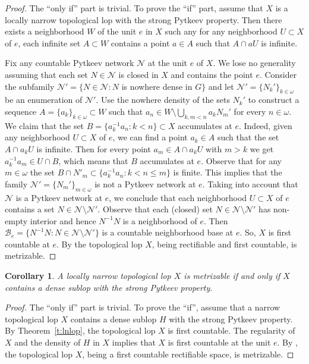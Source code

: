\documentclass{amsart}
\newtheorem{corollary}[theorem]{Corollary}
\theoremstyle{definition}
\begin{document}
\begin{proof} The ``only if'' part is trivial. To prove the ``if'' part, assume that $X$ is a locally narrow topological lop with the strong Pytkeev property. Then there exists a neighborhood $W$ of the unit $e$ in $X$ such any for any neighborhood $U\subset X$ of $e$, each infinite set $A\subset W$ contains a point $a\in A$ such that $A\cap aU$ is infinite.

Fix any countable Pytkeev network $\mathcal N$ at the unit $e$ of $X$.
We lose no generality assuming that each set $N\in\mathcal N$ is closed in $X$ and contains the point $e$.
Consider the subfamily $\mathcal N'=\{N\in \mathcal N: N$ is nowhere dense in $G\}$ and let $\mathcal N'=\{N_k'\}_{k\in{\omega}}$ be an enumeration of $\mathcal N'$. Use the nowhere density of the sets $N_k'$ to construct a sequence $A=\{a_k\}_{k\in{\omega}}\subset W$ such that $a_n\in W\setminus\bigcup_{k,m<n}a_kN_m'$ for every $n\in{\omega}$. We claim that the set $B=\{a_k^{-1}a_n:k<n\}\subset X$ accumulates at $e$. Indeed, given any neighborhood $U\subset X$ of $e$, we can find a point $a_k\in A$ such that the set  $A\cap a_kU$ is infinite. Then for every point $a_m\in A\cap a_kU$ with $m>k$ we get $a_k^{-1}a_m\in U\cap B$, which means that $B$ accumulates at $e$.
Observe that for any $m\in{\omega}$ the set $B\cap N'_m\subset \{a_k^{-1}a_n:k<n\le m\}$ is finite.
This implies that the family $\mathcal N'=\{N_m'\}_{m\in{\omega}}$ is not a Pytkeev network at $e$.
Taking into account that $\mathcal N$ is a Pytkeev network at $e$, we conclude that each neighborhood $U\subset X$ of $e$ contains a set $N\in\mathcal N\setminus \mathcal N'$. Observe that each (closed) set $N\in\mathcal N\setminus\mathcal N'$ has non-empty interior and hence $N^{-1}N$ is a neighborhood of $e$. Then $\mathcal B_e=\{N^{-1}N:N\in\mathcal N\setminus\mathcal N'\}$ is a countable neighborhood base at $e$. So, $X$ is first countable at $e$. By \cite{Gul} the topological lop $X$, being rectifiable and first countable, is metrizable.
\end{proof}

\begin{corollary}\label{c:lnlop} A locally narrow topological lop $X$ is metrizable if and only if $X$ contains a dense sublop with the strong Pytkeev property.
\end{corollary}

\begin{proof} The ``only if'' part is trivial. To prove the ``if'', assume that a narrow topological lop $X$ contains a dense sublop $H$ with the strong Pytkeev property. By Theorem~\ref{t:lnlop}, the topological lop $X$ is first countable. The regularity of $X$ and the density of $H$ in $X$ implies that $X$ is first countable at the unit $e$. By \cite{Gul}, the topological lop $X$, being a first countable rectifiable space, is metrizable.
\end{proof}
\end{document}

